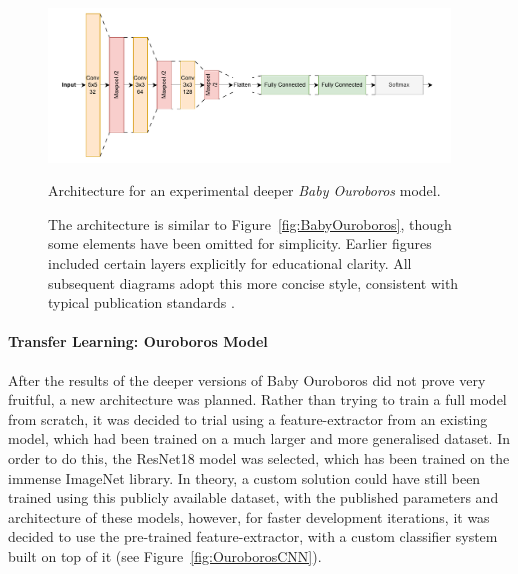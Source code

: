                 \begin{figure}[h]
                    \centering
                    \includegraphics[width=0.95\textwidth]{images/DeepCNN.pdf}
                    \caption{Architecture for an experimental deeper \textit{Baby Ouroboros} model.}
                    \label{fig:DeepCNN}
                    \caption*{
                        The architecture is similar to Figure~\ref{fig:BabyOuroboros}, though some elements have been omitted for simplicity. Earlier figures included certain layers explicitly for educational clarity. All subsequent diagrams adopt this more concise style, consistent with typical publication standards \cite{resnet}.
                    }
                \end{figure}
    
                \paragraph{Transfer Learning: Ouroboros Model}
    
                After the results of the deeper versions of Baby Ouroboros did not prove very fruitful, a new architecture was planned. Rather than trying to train a full model from scratch, it was decided to trial using a feature-extractor from an existing model, which had been trained on a much larger and more generalised dataset. In order to do this, the ResNet18 model was selected, which has been trained on the immense ImageNet library. In theory, a custom solution could have still been trained using this publicly available dataset, with the published parameters and architecture of these models, however, for faster development iterations, it was decided to use the pre-trained feature-extractor, with a custom classifier system built on top of it (see Figure~\ref{fig:OuroborosCNN}).
    
